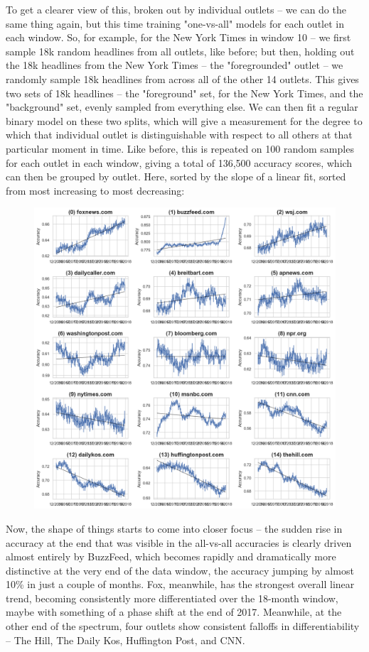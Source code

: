 \documentclass{scrartcl}
\begin{document}
To get a clearer view of this, broken out by individual outlets -- we can do the same thing again, but this time training "one-vs-all" models for each outlet in each window. So, for example, for the New York Times in window 10 -- we first sample 18k random headlines from all outlets, like before; but then, holding out the 18k headlines from the New York Times -- the "foregrounded" outlet -- we randomly sample 18k headlines from across all of the other 14 outlets. This gives two sets of 18k headlines -- the "foreground" set, for the New York Times, and the "background" set, evenly sampled from everything else. We can then fit a regular binary model on these two splits, which will give a measurement for the degree to which that individual outlet is distinguishable with respect to all others at that particular moment in time. Like before, this is repeated on 100 random samples for each outlet in each window, giving a total of 136,500 accuracy scores, which can then be grouped by outlet. Here, sorted by the slope of a linear fit, sorted from most increasing to most decreasing:

\begin{figure}[H]
  \centering
  \includegraphics[height=\textheight]{figures/ts-ova.png}
\end{figure}

Now, the shape of things starts to come into closer focus -- the sudden rise in accuracy at the end that was visible in the all-vs-all accuracies is clearly driven almost entirely by BuzzFeed, which becomes rapidly and dramatically more distinctive at the very end of the data window, the accuracy jumping by almost 10\% in just a couple of months. Fox, meanwhile, has the strongest overall linear trend, becoming consistently more differentiated over the 18-month window, maybe with something of a phase shift at the end of 2017. Meanwhile, at the other end of the spectrum, four outlets show consistent falloffs in differentiability -- The Hill, The Daily Kos, Huffington Post, and CNN.
\end{document}
